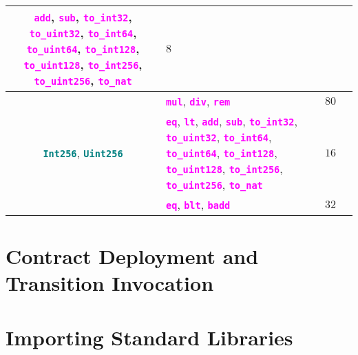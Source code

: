 \documentclass[9pt]{article}
\begin{document}
\begin{table}[!hbt]
\begin{tabular}{|c|p{4.1cm}|p{4cm}|p{4cm}|}
		 \textbf{\texttt{\textcolor{magenta}{add}}},
		 \textbf{\texttt{\textcolor{magenta}{sub}}},
		 \textbf{\texttt{\textcolor{magenta}{to\_int32}}},
		 \textbf{\texttt{\textcolor{magenta}{to\_uint32}}},
		 \textbf{\texttt{\textcolor{magenta}{to\_int64}}},
		 \textbf{\texttt{\textcolor{magenta}{to\_uint64}}},
		 \textbf{\texttt{\textcolor{magenta}{to\_int128}}},
		 \textbf{\texttt{\textcolor{magenta}{to\_uint128}}},
		 \textbf{\texttt{\textcolor{magenta}{to\_int256}}},
		 \textbf{\texttt{\textcolor{magenta}{to\_uint256}}},
		 \textbf{\texttt{\textcolor{magenta}{to\_nat}}}
		 & $8$  & \\ \hline \hline
		\multirow{4}{*}{\textbf{\texttt{\textcolor{teal}{Int256}}},
		\textbf{\texttt{\textcolor{teal}{Uint256}}}} &
		\textbf{\texttt{\textcolor{magenta}{mul}}},
		 \textbf{\texttt{\textcolor{magenta}{div}}},
		 \textbf{\texttt{\textcolor{magenta}{rem}}} &
		 $ 80 $  & \\ \cline{2-4}
		 &
		 \textbf{\texttt{\textcolor{magenta}{eq}}},
		 \textbf{\texttt{\textcolor{magenta}{lt}}},
		 \textbf{\texttt{\textcolor{magenta}{add}}},
		 \textbf{\texttt{\textcolor{magenta}{sub}}},
		 \textbf{\texttt{\textcolor{magenta}{to\_int32}}},
		 \textbf{\texttt{\textcolor{magenta}{to\_uint32}}},
		 \textbf{\texttt{\textcolor{magenta}{to\_int64}}},
		 \textbf{\texttt{\textcolor{magenta}{to\_uint64}}},
		 \textbf{\texttt{\textcolor{magenta}{to\_int128}}},
		 \textbf{\texttt{\textcolor{magenta}{to\_uint128}}},
		 \textbf{\texttt{\textcolor{magenta}{to\_int256}}},
		 \textbf{\texttt{\textcolor{magenta}{to\_uint256}}},
		 \textbf{\texttt{\textcolor{magenta}{to\_nat}}}
		 & $ 16 $  & \\ \hline \hline
		\textbf{\texttt{\textcolor{teal}{BNum}}} &
		\textbf{\texttt{\textcolor{magenta}{eq}}},
		\textbf{\texttt{\textcolor{magenta}{blt}}},
		\textbf{\texttt{\textcolor{magenta}{badd}}} & $32$  & \\ \hline 
	\end{tabular}
\end{table}



\section{Contract Deployment and Transition Invocation}

\section{Importing Standard Libraries}
\end{document}
